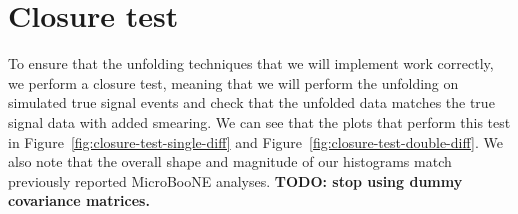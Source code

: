 \documentclass{article}
\begin{document}
\section{Closure test}

To ensure that the unfolding techniques that we will implement work correctly, we perform a closure test, meaning that we will perform the unfolding on simulated true signal events and check that the unfolded data matches the true signal data with added smearing. We can see that the plots that perform this test in Figure~\ref{fig:closure-test-single-diff} and Figure~\ref{fig:closure-test-double-diff}. We also note that the overall shape and magnitude of our histograms match previously reported MicroBooNE analyses. \textbf{TODO: stop using dummy covariance matrices.}

\begin{figure}
    \centering
     \\

\end{figure}
\end{document}

